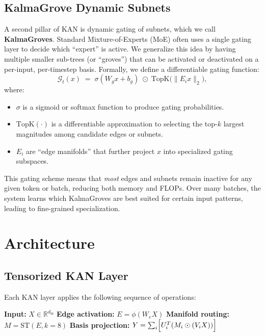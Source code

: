 \documentclass[twocolumn]{article}
\begin{document}
\subsection{KalmaGrove Dynamic Subnets}
A second pillar of KAN is dynamic gating of subnets, which we call \textbf{KalmaGroves}. Standard Mixture-of-Experts (MoE) often uses a single gating layer to decide which ``expert'' is active. We generalize this idea by having multiple smaller sub-trees (or ``groves'') that can be activated or deactivated on a per-input, per-timestep basis. Formally, we define a differentiable gating function:
\[
\mathcal{G}_t(x) \;=\; \sigma(W_g x + b_g) \; \odot \; \mathrm{TopK}\!\bigl(\|E_i x\|_2\bigr),
\]
where:
\begin{itemize}
    \item $\sigma$ is a sigmoid or softmax function to produce gating probabilities.
    \item $\mathrm{TopK}(\cdot)$ is a differentiable approximation to selecting the top-$k$ largest magnitudes among candidate edges or subnets.
    \item $E_i$ are ``edge manifolds'' that further project $x$ into specialized gating subspaces.
\end{itemize}

This gating scheme means that \emph{most} edges and subnets remain inactive for any given token or batch, reducing both memory and FLOPs. Over many batches, the system learns which KalmaGroves are best suited for certain input patterns, leading to fine-grained specialization.

\section{Architecture}

\subsection{Tensorized KAN Layer}
Each KAN layer applies the following sequence of operations:

\begin{algorithmic}
\STATE \textbf{Input:} $X \in \mathbb{R}^{d_{\mathrm{in}}}$
\STATE \textbf{Edge activation:} $E = \phi(W_e X)$ 
\STATE \textbf{Manifold routing:} $M = \mathrm{ST}(E, k=8)$ 
\STATE \textbf{Basis projection:} $Y = \sum_i \Bigl[ U_i^T (M_i \odot (V_i X)) \Bigr]$
\end{algorithmic}
\end{document}
